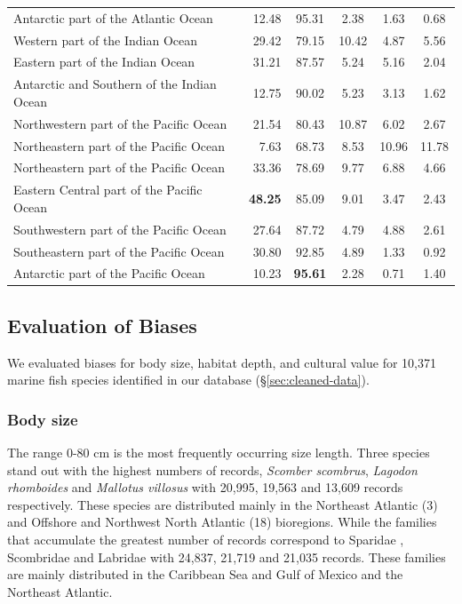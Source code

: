\documentclass[12pt,authoryear]{elsarticle}
\begin{document}
\begin{table}[h]
\begin{tabular}{| l | r | c | c  | c | c |}
Antarctic part of the Atlantic Ocean       & 12.48 & 95.31 &  2.38 &  1.63 &  0.68 \\ 
Western part of the Indian Ocean           & 29.42 & 79.15 & 10.42 &  4.87 &  5.56 \\ 
Eastern part of the Indian Ocean           & 31.21 & 87.57 &  5.24 &  5.16 &  2.04 \\ 
Antarctic and Southern of the Indian Ocean & 12.75 & 90.02 &  5.23 &  3.13 &  1.62 \\ 
Northwestern part of the Pacific Ocean     & 21.54 & 80.43 & 10.87 &  6.02 &  2.67 \\ 
Northeastern part of the Pacific Ocean     &  7.63 & 68.73 &  8.53 & 10.96 & 11.78 \\ 
Northeastern part of the Pacific Ocean     & 33.36 & 78.69 &  9.77 &  6.88 &  4.66 \\ 
Eastern Central part of the Pacific Ocean  & \textbf{48.25} & 85.09 &  9.01 &  3.47 &  2.43 \\ 
Southwestern part of the Pacific Ocean     & 27.64 & 87.72 &  4.79 &  4.88 &  2.61 \\ 
Southeastern part of the Pacific Ocean     & 30.80 & 92.85 &  4.89 &  1.33 &  0.92 \\ 
Antarctic part of the Pacific Ocean        & 10.23 & \textbf{95.61} &  2.28 &  0.71 &  1.40 \\ 
   \hline
\end{tabular}
\end{table}


\subsection{Evaluation of Biases}

We evaluated biases for body size, habitat depth, and cultural value for 10,371 marine fish species identified in our database (\S \ref{sec:cleaned-data}).

\subsubsection{Body size}
The range 0-80 cm is the most frequently occurring size length. Three species stand out with the highest numbers of records, \textit{Scomber scombrus}, \textit{Lagodon rhomboides} and \textit{Mallotus villosus}  with 20,995, 19,563 and 13,609 records respectively. These species are distributed mainly in the Northeast Atlantic (3) and Offshore and Northwest North Atlantic (18) bioregions. While the families that accumulate the greatest number of records correspond to Sparidae , Scombridae and Labridae with 24,837, 21,719 and 21,035 records. These families are mainly distributed in the Caribbean Sea and Gulf of Mexico and the Northeast Atlantic.  
\end{document}
